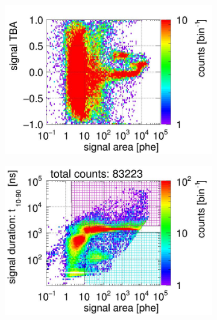 \begin{landscape}
\begin{figure}[!p]
\begin{subfigure}[t]{0.32\textwidth}
			\includegraphics[width=\figurewidth,clip,trim={0 8 0 40}]{Figures/GasTest/CutsValid/res64771/tbapaX23Vecfig64771.jpg}
			\caption{}
			\label{fig:signal selection dv 16 02}
		\end{subfigure}
		\begin{subfigure}[t]{0.32\textwidth}
			\centering
			\includegraphics[width=\figurewidth,clip,trim={0 98 0 15}]{Figures/GasTest/CutsValid/res64771/pdpa26Vecfig64771.jpg}

\end{subfigure}
\end{figure}
\end{landscape}
